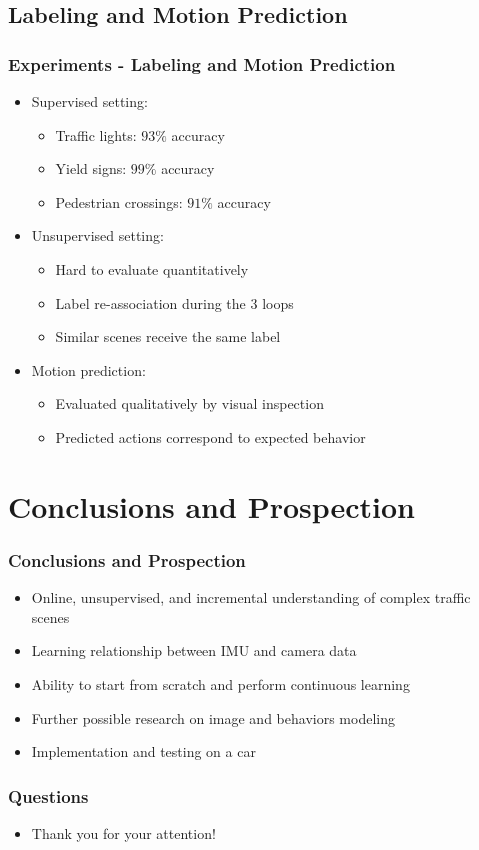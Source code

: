 \documentclass{beamer}
\begin{document}
\subsection{Labeling and Motion Prediction}
\begin{frame}[t]
  \frametitle{Experiments - Labeling and Motion Prediction}
  \begin{itemize}
    \item Supervised setting:
      \begin{itemize}
        \item Traffic lights: $93\%$ accuracy
        \item Yield signs: $99\%$ accuracy
        \item Pedestrian crossings: $91\%$ accuracy
      \end{itemize}
    \item Unsupervised setting:
      \begin{itemize}
        \item Hard to evaluate quantitatively
        \item Label re-association during the 3 loops
        \item Similar scenes receive the same label
      \end{itemize}
    \item Motion prediction:
      \begin{itemize}
        \item Evaluated qualitatively by visual inspection
        \item Predicted actions correspond to expected behavior
      \end{itemize}
  \end{itemize}
\end{frame}

\section{Conclusions and Prospection}
\begin{frame}[t]
  \frametitle{Conclusions and Prospection}
  \begin{itemize}
    \item Online, unsupervised, and incremental understanding of complex traffic
      scenes
    \item Learning relationship between IMU and camera data
    \item Ability to start from scratch and perform continuous learning
  \end{itemize}
  \begin{itemize}
    \item Further possible research on image and behaviors modeling
    \item Implementation and testing on a car
  \end{itemize}
\end{frame}

\begin{frame}[t]
  \frametitle{Questions}
  \begin{itemize}
    \item Thank you for your attention!
  \end{itemize}
\end{frame}
\end{document}
